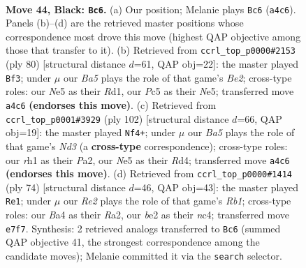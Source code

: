 \documentclass[11pt]{article}
\begin{document}
\clearpage

\begin{figure}[p]\centering
\begin{subfigure}{0.46\textwidth}\centering
\resizebox{\linewidth}{!}{%
\newchessgame
\chessboard[
  setfen={1r6/4r3/1p5k/p1p1n3/b5p1/2P3P1/1K1NB2P/4R1NR b - - 1 44},
  showmover=false,
  pgfstyle=straightmove, color=movearrow, markmove={a4-c6}
]}
\caption{}
\end{subfigure}\hfill
\begin{subfigure}{0.46\textwidth}\centering
\resizebox{\linewidth}{!}{%
\newchessgame
\chessboard[
  setfen={6k1/pb5p/1p5r/2nPNp2/5P2/4P3/P3B3/3R2K1 w - - 0 41},
  showmover=false,
  pgfstyle=straightmove, color=movearrow, markmove={e2-f3}
]}
\caption{}
\end{subfigure}
\\[4pt]
\begin{subfigure}{0.46\textwidth}\centering
\resizebox{\linewidth}{!}{%
\newchessgame
\chessboard[
  setfen={8/1pr1b3/p3k1p1/5p2/3R3P/1P1N1P2/P4P2/3K4 w - - 23 52},
  showmover=false,
  pgfstyle=straightmove, color=movearrow, markmove={d3-f4}
]}
\caption{}
\end{subfigure}\hfill
\begin{subfigure}{0.46\textwidth}\centering
\resizebox{\linewidth}{!}{%
\newchessgame
\chessboard[
  setfen={2rb4/p5pp/4k3/P2pp3/2n4P/1NP2KP1/R7/1R6 w - - 5 38},
  showmover=false,
  pgfstyle=straightmove, color=movearrow, markmove={b1-e1}
]}
\caption{}
\end{subfigure}
\caption{\textbf{Move 44, Black: \texttt{Bc6}.} (a) Our position; Melanie plays \texttt{Bc6} (\texttt{a4c6}). Panels (b)--(d) are the retrieved master positions whose correspondence most drove this move (highest QAP objective among those that transfer to it). (b) Retrieved from \texttt{ccrl\_top\_p0000\#2153} (ply 80) [structural distance $d$=61, QAP obj=22]: the master played \texttt{Bf3}; under $\mu$ our \emph{Ba5} plays the role of that game's \emph{Be2}; cross-type roles: our \emph{N}e5 as their \emph{R}d1, our \emph{P}c5 as their \emph{N}e5; transferred move \texttt{a4c6} \textbf{(endorses this move)}. (c) Retrieved from \texttt{ccrl\_top\_p0001\#3929} (ply 102) [structural distance $d$=66, QAP obj=19]: the master played \texttt{Nf4+}; under $\mu$ our \emph{Ba5} plays the role of that game's \emph{Nd3} (a \textbf{cross-type} correspondence); cross-type roles: our \emph{r}h1 as their \emph{P}a2, our \emph{N}e5 as their \emph{R}d4; transferred move \texttt{a4c6} \textbf{(endorses this move)}. (d) Retrieved from \texttt{ccrl\_top\_p0000\#1414} (ply 74) [structural distance $d$=46, QAP obj=43]: the master played \texttt{Re1}; under $\mu$ our \emph{Re2} plays the role of that game's \emph{Rb1}; cross-type roles: our \emph{B}a4 as their \emph{R}a2, our \emph{b}e2 as their \emph{n}c4; transferred move \texttt{e7f7}. Synthesis: 2 retrieved analogs transferred to \texttt{Bc6} (summed QAP objective 41, the strongest correspondence among the candidate moves); Melanie committed it via the \texttt{search} selector.}
\label{fig:thought-m87}
\end{figure}
\end{document}
